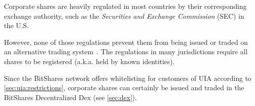 Corporate shares are heavily regulated in most countries by their corresponding
exchange authority, such as the \emph{Securities and Exchange Commission} (SEC)
in the U.S.

However, none of those regulations prevent them from being issued or traded on
an alternative trading system~\cite{altTrade}. The regulations in many
jurisdictions require all shares to be registered (a.k.a. held by known
identities). 

Since the BitShares network offers whitelisting for customers of UIA according
to \cref{sec:uia:restrictions}, corporate shares can certainly be issued and
traded in the BitShares Decentralized Dex (see \cref{sec:dex}).

